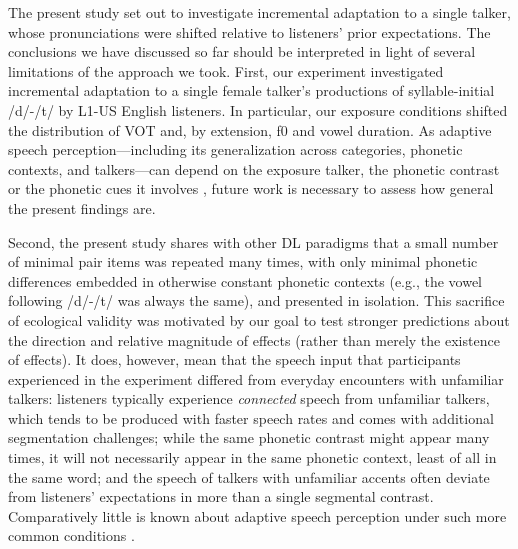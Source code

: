 \documentclass[
  11pt,
  man,mask,floatsintext]{apa6}
\begin{document}
The present study set out to investigate incremental adaptation to a single talker, whose pronunciations were shifted relative to listeners' prior expectations. The conclusions we have discussed so far should be interpreted in light of several limitations of the approach we took. First, our experiment investigated incremental adaptation to a single female talker's productions of syllable-initial /d/-/t/ by L1-US English listeners. In particular, our exposure conditions shifted the distribution of VOT and, by extension, f0 and vowel duration. As adaptive speech perception---including its generalization across categories, phonetic contexts, and talkers---can depend on the exposure talker, the phonetic contrast or the phonetic cues it involves \autocites[e.g.,][]{eisner-mcqueen2005,kraljic-samuel2007,mitterer2013,xie2017,xie2021jep}, future work is necessary to assess how general the present findings are.

Second, the present study shares with other DL paradigms that a small number of minimal pair items was repeated many times, with only minimal phonetic differences embedded in otherwise constant phonetic contexts (e.g., the vowel following /d/-/t/ was always the same), and presented in isolation. This sacrifice of ecological validity was motivated by our goal to test stronger predictions about the direction and relative magnitude of effects (rather than merely the existence of effects). It does, however, mean that the speech input that participants experienced in the experiment differed from everyday encounters with unfamiliar talkers: listeners typically experience \emph{connected} speech from unfamiliar talkers, which tends to be produced with faster speech rates and comes with additional segmentation challenges; while the same phonetic contrast might appear many times, it will not necessarily appear in the same phonetic context, least of all in the same word; and the speech of talkers with unfamiliar accents often deviate from listeners' expectations in more than a single segmental contrast. Comparatively little is known about adaptive speech perception under such more common conditions \autocites[even AA studies have typically focused on short isolated sentences,][]{bradlow-bent2008,clarke-garrett2004}[and the many studies inspired by these pioneering works]{sidaras2009}.
\end{document}
